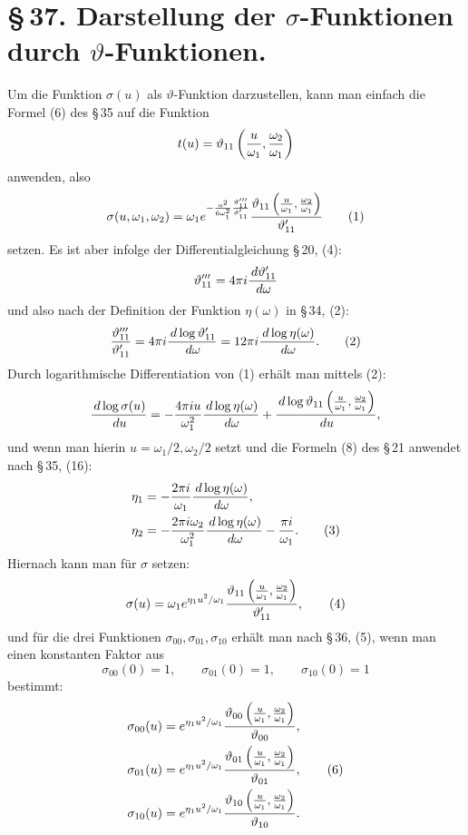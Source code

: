 \documentclass[11pt]{article}
\providecommand{\dd}{\,d}
\providecommand{\tht}{\vartheta}
\begin{document}
\section*{\S\,37. Darstellung der $\sigma$-Funktionen durch $\vartheta$-Funktionen.}

Um die Funktion $\sigma(u)$ als $\vartheta$-Funktion darzustellen, kann man einfach die Formel (6) des \S\,35 auf die Funktion
\[
t(u)=\tht_{11}\left({u\over\omega_1},{\omega_2\over\omega_1}\right)
\]
anwenden, also
\begin{equation}
\sigma(u,
\omega_1,
\omega_2)
=\omega_1 e^{-{u^2\over6\omega_1^2}{\tht'''_{11}\over\tht'_{11}}}
{\tht_{11}\left({u\over\omega_1},{\omega_2\over\omega_1}\right)
\over \tht'_{11}} \tag{1}
\end{equation}
setzen. Es ist aber infolge der Differentialgleichung \S\,20, (4):
\[
\tht'''_{11}=4\pi i{\dd\tht'_{11}\over \dd\omega}
\]
und also nach der Definition der Funktion $\eta(\omega)$ in \S\,34, (2):
\begin{equation}
{\tht'''_{11}\over\tht'_{11}}
=4\pi i{\dd\log\tht'_{11}\over\dd\omega}
=12\pi i{\dd\log\eta(\omega)\over\dd\omega}. \tag{2}
\end{equation}
Durch logarithmische Differentiation von (1) erhält man mittels (2):
\[
{\dd\log\sigma(u)\over\dd u}
=-{4\pi i u\over\omega_1^2}{\dd\log\eta(\omega)\over\dd\omega}
+{\dd\log\tht_{11}\left({u\over\omega_1},{\omega_2\over\omega_1}\right)
\over\dd u},
\]
und wenn man hierin $u=\omega_1/2,\omega_2/2$ setzt und die Formeln (8) des \S\,21 anwendet nach \S\,35, (16):
\begin{align}
\eta_1&=-{2\pi i\over\omega_1}{\dd\log\eta(\omega)\over\dd\omega},\notag\\
\eta_2&=-{2\pi i\omega_2\over\omega_1^2}{\dd\log\eta(\omega)\over\dd\omega}-{\pi i\over\omega_1}. \tag{3}
\end{align}
Hiernach kann man für $\sigma$ setzen:
\begin{equation}
\sigma(u)=\omega_1 e^{\eta_1u^2/\omega_1}
{\tht_{11}\left({u\over\omega_1},{\omega_2\over\omega_1}\right)
\over\tht'_{11}}, \tag{4}
\end{equation}
und für die drei Funktionen $\sigma_{00},\sigma_{01},\sigma_{10}$ erhält man nach \S\,36, (5), wenn man einen konstanten Faktor aus
\begin{equation}
\sigma_{00}(0)=1,
\qquad
\sigma_{01}(0)=1,
\qquad
\sigma_{10}(0)=1 \tag{5}
\end{equation}
bestimmt:
\begin{align}
\sigma_{00}(u)&=e^{\eta_1u^2/\omega_1}
{\tht_{00}\left({u\over\omega_1},{\omega_2\over\omega_1}\right)
\over\tht_{00}},\notag\\
\sigma_{01}(u)&=e^{\eta_1u^2/\omega_1}
{\tht_{01}\left({u\over\omega_1},{\omega_2\over\omega_1}\right)
\over\tht_{01}}, \tag{6}\\
\sigma_{10}(u)&=e^{\eta_1u^2/\omega_1}
{\tht_{10}\left({u\over\omega_1},{\omega_2\over\omega_1}\right)
\over\tht_{10}}.\notag
\end{align}
\end{document}
